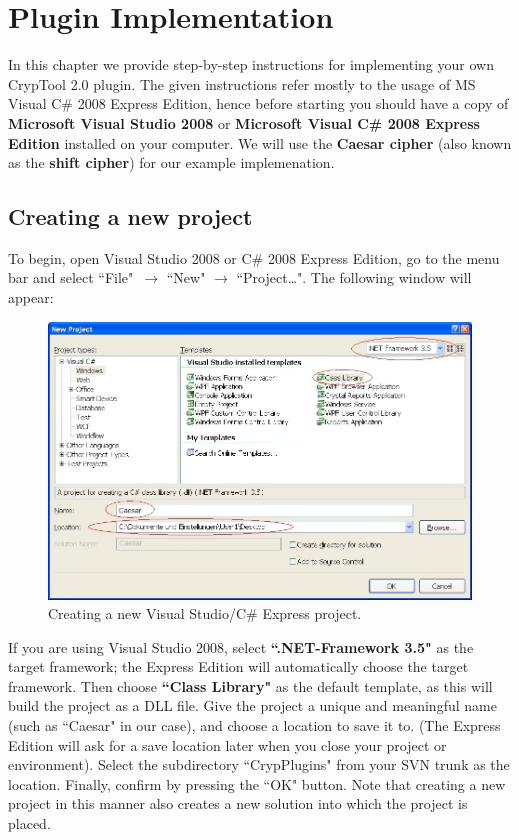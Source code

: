 \chapter{Plugin Implementation}
\label{sec:PluginImplementation}
In this chapter we provide step-by-step instructions for implementing your own CrypTool 2.0 plugin. The given instructions refer mostly to the usage of MS Visual C\# 2008 Express Edition, hence before starting you should have a copy of \textbf{Microsoft Visual Studio 2008} or \textbf{Microsoft Visual C\# 2008 Express Edition} installed on your computer. We will use the \textbf{Caesar cipher} (also known as the \textbf{shift cipher}) for our example implemenation.

\section{Creating a new project}
\label{sec:CreatingANewProject}

To begin, open Visual Studio 2008 or C\# 2008 Express Edition, go to the menu bar and select ``File"~$\rightarrow$ ``New" $\rightarrow$ ``Project\ldots ". The following window will appear:

\begin{figure}[h!]
	\centering
		\includegraphics[width=1.00\textwidth]{figures/vs_create_new_project.jpg}
	\caption{Creating a new Visual Studio/C\# Express project.}
	\label{fig:vs_create_new_project}
\end{figure}

If you are using Visual Studio 2008, select \textbf{``.NET-Framework 3.5"} as the target framework; the Express Edition will automatically choose the target framework. Then choose \textbf{``Class Library"} as the default template, as this will build the project as a DLL file. Give the project a unique and meaningful name (such as ``Caesar" in our case), and choose a location to save it to. (The Express Edition will ask for a save location later when you close your project or environment). Select the subdirectory ``CrypPlugins" from your SVN trunk as the location. Finally, confirm by pressing the ``OK" button. Note that creating a new project in this manner also creates a new solution into which the project is placed.

